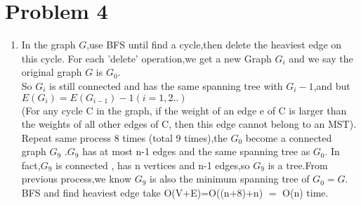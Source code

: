 \documentclass[paper=a4, fontsize=11pt]{scrartcl} %
\numberwithin{equation}{section} %
\numberwithin{figure}{section} %
\numberwithin{table}{section} %
\begin{document}
\section*{Problem 4}
\begin{enumerate}[label={4.\arabic*}]
  \item 
In the graph ${G }$,use BFS until find a cycle,then delete the heaviest edge on this cycle.
For each 'delete' operation,we get a new Graph ${G_i}$ and we say the original graph ${G}$ is ${G_0}$.\\
So ${G_i }$ is still connected and has the same spanning tree with ${G_i -1}$,and   but ${E(G_i)=E(G_{i-1})-1 (i=1,2..)}$ \\(For any cycle C in the graph, if the weight of an edge e of C is larger than the weights of all other edges of C, then this edge cannot belong to an MST).
Repeat same process 8 times (total 9 times),the ${G_0}$ become a connected graph ${G_9}$ .${G_9}$ has at most  n-1 edges and the same spanning tree as ${G_0}$.
In fact,${G_9}$ is connected , has n vertices and n-1 edges,so ${G_9}$ is a tree.From previous process,we know ${G_9}$ is also the minimum spanning tree of ${G_0=G}$.\\
BFS and find heaviest edge take O(V+E)=O((n+8)+n) $ =$ O(n) time. 

\end{enumerate}
\end{document}
